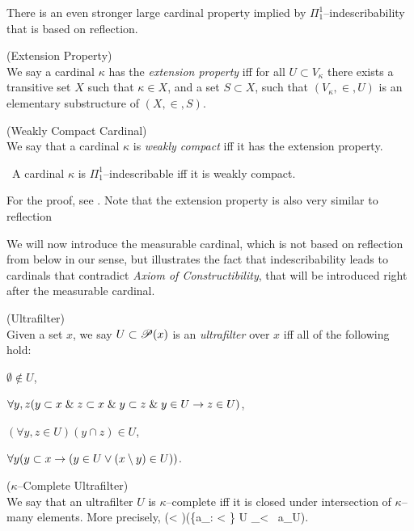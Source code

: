 There is an even stronger large cardinal property implied by $\Pi_1^1$–indescribability that is based on reflection.

\begin{definition}{(Extension Property)}\label{def:extension_property}\\
We say a cardinal $\kappa$ has the \emph{extension property} iff for all $U \subset V_\kappa$ there exists a transitive set $X$ such that $\kappa \in X$, and a set $S \subset X$, such that $(V_\kappa, \in, U)$ is an elementary substructure of $(X, \in, S)$.
\end{definition}

\begin{definition}{(Weakly Compact Cardinal)}\label{def:weakly_compact_cardinal}\\
We say that a cardinal $\kappa$ is \emph{weakly compact} iff it has the extension property.
\end{definition}

\begin{theorem}\
A cardinal $\kappa$ is $\Pi_1^1$–indescribable iff it is weakly compact.
\end{theorem}
For the proof, see \cite{KanamoriBook}.
Note that the extension property is also very similar to reflection

We will now introduce the measurable cardinal, which is not based on reflection from below in our sense, but illustrates the fact that indescribability leads to cardinals that contradict \emph{Axiom of Constructibility}, that will be introduced right after the measurable cardinal.

\begin{definition}{(Ultrafilter)}\\
Given a set $x$, we say $U \subset \mathscr{P} (x)$ is an \emph{ultrafilter} over $x$ iff all of the following hold:
\bce[(i)]
\item $\emptyset \not\in U$,
\item $\forall y, z (y \subset x \mathrel{\&} z \subset x \mathrel{\&} y \subset z \mathrel{\&} y \in U \rightarrow z \in U)$,
\item $(\forall y, z \in U)(y \cap z) \in U$,
\item $\forall y (y \subset x \rightarrow (y \in U \lor (x \setminus y) \in U))$.
\ece
\end{definition}

\begin{definition}{($\kappa$–Complete Ultrafilter)}\\
We say that an ultrafilter $U$ is $\kappa$–complete iff it is closed under intersection of $\kappa$–many elements. More precisely,
\beq
(\forall \gamma < \kappa)(\{a_\alpha : \alpha < \gamma \} \subseteq U \then \bigcup_{\alpha < \gamma} a_\alpha \in U)\mbox{.}
\eeq
\end{definition}

